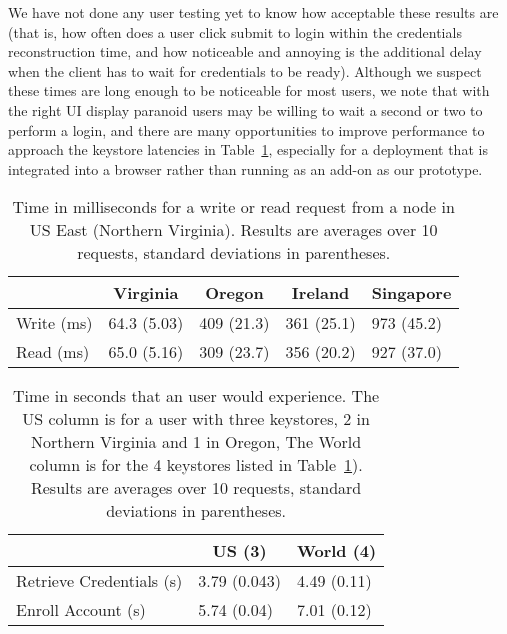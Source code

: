 We have not done any user testing yet to know how acceptable these results are (that is, how often does a user click submit to login within the credentials reconstruction time, and how noticeable and annoying is the additional delay when the client has to wait for credentials to be ready). Although we suspect these times are long enough to be noticeable for most users, we note that with the right UI display paranoid users may be willing to wait a second or two to perform a login, and there are many opportunities to improve performance to approach the keystore latencies in Table~\ref{fig:performance_latency}, especially for a deployment that is integrated into a browser rather than running as an add-on as our prototype.



\begin{table}[tb]
\centering

\begin{tabular}{@{}lllll@{}}
\toprule
    & \multicolumn{1}{c}{Virginia} & \multicolumn{1}{c}{Oregon} & \multicolumn{1}{c}{Ireland}   & \multicolumn{1}{c}{Singapore} \\ \midrule
Write (ms)       & 64.3 (5.03) & 409 (21.3) & 361 (25.1) & 973 (45.2)    \\
Read (ms) & 65.0 (5.16)   &  309 (23.7) & 356 (20.2) & 927 (37.0)  \\ 
\bottomrule
\end{tabular}
\caption{Time in milliseconds for a write or read request from a node in US East (Northern Virginia). {\rm Results are averages over 10 requests, standard deviations in parentheses.}}
\label{fig:performance_latency}
\end{table}

\begin{table}[tb]
\centering

\begin{tabular}{@{}lll@{}}
\toprule
    & \multicolumn{1}{c}{US (3)} & \multicolumn{1}{c}{World (4)} \\ \midrule
Retrieve Credentials (s) & 3.79 (0.043)   & 4.49 (0.11)      \\
Enroll Account (s) & 5.74 (0.04) &  7.01 (0.12)  \\ 
\bottomrule
\end{tabular}
\caption{Time in seconds that an user would experience. {\rm The US column is for a user with three keystores, 2 in Northern Virginia and 1 in Oregon, The World column is for the 4 keystores listed in Table~\ref{fig:performance_latency}). {\rm Results are averages over 10 requests, standard deviations in parentheses.}}}

\label{fig:performance_user_experience}
\end{table}